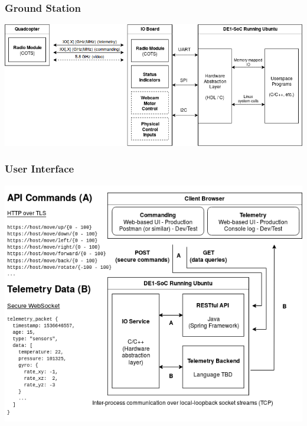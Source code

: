 \documentclass{beamer}
\begin{document}
\begin{frame}
\frametitle{Ground Station}
\begin{center}
\includegraphics[width=\linewidth]{../src/im/ground_station}
\end{center}
\end{frame}

\begin{frame}
\frametitle{User Interface}
\begin{center}
\includegraphics[width=\linewidth]{../src/im/display_controller}
\end{center}
\end{frame}
\end{document}
